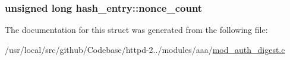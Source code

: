 \subsubsection[{\texorpdfstring{nonce\+\_\+count}{nonce_count}}]{\setlength{\rightskip}{0pt plus 5cm}unsigned long hash\+\_\+entry\+::nonce\+\_\+count}\hypertarget{structhash__entry_a27a2099565842fc981b681071e41cf39}{}\label{structhash__entry_a27a2099565842fc981b681071e41cf39}


The documentation for this struct was generated from the following file\+:\begin{DoxyCompactItemize}
\item 
/usr/local/src/github/\+Codebase/httpd-\/2../modules/aaa/\hyperlink{mod__auth__digest_8c}{mod\+\_\+auth\+\_\+digest.\+c}\end{DoxyCompactItemize}
